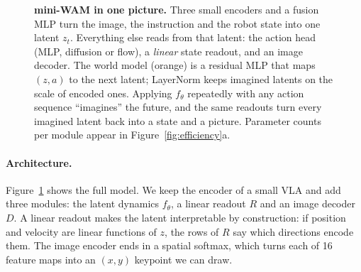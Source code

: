 \documentclass[11pt]{article}
\begin{document}
\begin{figure}[!htbp]
\centering
{}
\caption{\textbf{mini-WAM in one picture.} Three small encoders and a fusion MLP turn the image, the instruction and the robot state into one latent $z_t$. Everything else reads from that latent: the action head (MLP, diffusion or flow), a \emph{linear} state readout, and an image decoder. The world model (orange) is a residual MLP that maps $(z, a)$ to the next latent; LayerNorm keeps imagined latents on the scale of encoded ones. Applying $f_\theta$ repeatedly with any action sequence ``imagines'' the future, and the same readouts turn every imagined latent back into a state and a picture. Parameter counts per module appear in Figure~\ref{fig:efficiency}a.}
\label{fig:arch}
\end{figure}

\paragraph{Architecture.} Figure~\ref{fig:arch} shows the full model. We keep the encoder of a small VLA and add three modules: the latent dynamics $f_\theta$, a linear readout $R$ and an image decoder $D$. A linear readout makes the latent interpretable by construction: if position and velocity are linear functions of $z$, the rows of $R$ say which directions encode them. The image encoder ends in a spatial softmax, which turns each of 16 feature maps into an $(x, y)$ keypoint we can draw.
\end{document}

